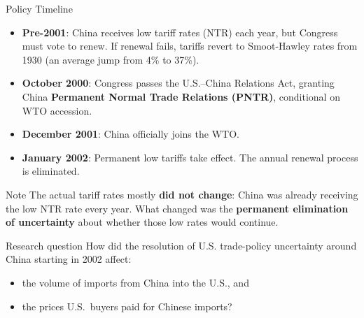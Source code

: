 \documentclass[aspectratio=169]{beamer}
\begin{document}
\begin{frame}{Policy Timeline}
  \small
  \begin{itemize}
    \item \textbf{Pre-2001}: China receives low tariff rates (NTR) each year, but Congress must vote to renew. If renewal fails, tariffs revert to Smoot-Hawley rates from 1930 (an average jump from 4\% to 37\%).
    \item \textbf{October 2000}: Congress passes the U.S.--China Relations Act, granting China \textbf{Permanent Normal Trade Relations (PNTR)}, conditional on WTO accession.
    \item \textbf{December 2001}: China officially joins the WTO.
    \item \textbf{January 2002}: Permanent low tariffs take effect. The annual renewal process is eliminated.
  \end{itemize}

  \vspace{0.3cm}
  \begin{block}{Note}
    The actual tariff rates mostly \textbf{did not change}: China was already receiving the low NTR rate every year. What changed was the \textbf{permanent elimination of uncertainty} about whether those low rates would continue.
  \end{block}
\end{frame}

\begin{frame}{}
  \begin{block}{Research question}
    How did the resolution of U.S. trade-policy uncertainty around China starting in 2002 affect:
    \begin{itemize}
      \item the volume of imports from China into the U.S., and
      \item the prices U.S.\ buyers paid for Chinese imports?
    \end{itemize}
  \end{block}

\end{frame}

\end{document}
